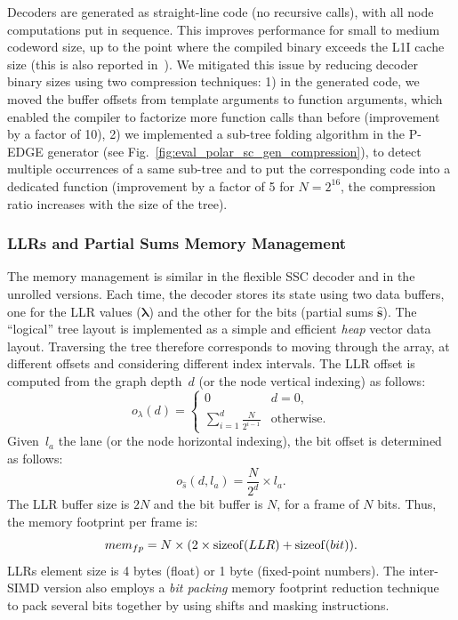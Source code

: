 Decoders are generated as straight-line code (no recursive calls), with all node
computations put in sequence. This improves performance for small to medium
codeword size, up to the point where the compiled binary exceeds the L1I cache
size (this is also reported in~\cite{Giard2016b}). We mitigated this issue by
reducing decoder binary sizes using two compression techniques: 1) in the
generated code, we moved the buffer offsets from template arguments to function
arguments, which enabled the compiler to factorize more function calls than
before (improvement by a factor of 10), 2) we implemented a sub-tree folding
algorithm in the P-EDGE generator (see
Fig.~\ref{fig:eval_polar_sc_gen_compression}), to detect multiple occurrences of
a same sub-tree and to put the corresponding code into a dedicated function
(improvement by a factor of 5 for $N=2^{16}$, the compression ratio increases
with the size of the tree).

\subsubsection{LLRs and Partial Sums Memory Management}

The memory management is similar in the flexible SSC decoder and in the unrolled
versions. Each time, the decoder stores its state using two data buffers, one
for the LLR values ($\bm{\lambda}$) and the other for the bits (partial sums
$\bm{\hat{s}}$). The ``logical'' tree layout is implemented as a simple and
efficient \emph{heap} vector data layout. Traversing the tree therefore
corresponds to moving through the array, at different offsets and considering
different index intervals. The LLR offset is computed from the graph depth~$d$
(or the node vertical indexing) as follows:
\begin{equation}
 o_{\lambda}(d) = \begin{cases}
   0                                         &\text{$d = 0$},\\
   \sum\limits_{i = 1}^{d} \frac{N}{2^{i-1}} &\text{otherwise.}
\end{cases}
\end{equation}
Given~$l_a$ the lane (or the node horizontal indexing), the bit offset is
determined as follows:
\begin{equation}
  o_{\hat{s}}(d,l_a) = \frac{N}{2^d} \times l_a.
\end{equation}
The LLR buffer size is $2N$ and the bit buffer is $N$, for a frame of $N$ bits.
Thus, the memory footprint per frame is:
\begin{equation}
  mem_{fp} = N \times (2 \times \operatorname*{sizeof}(LLR) + \operatorname*{sizeof}(bit)).
\end{equation}
LLRs element size is 4 bytes (float) or 1 byte (fixed-point numbers). The
inter-SIMD version also employs a \emph{bit packing} memory footprint reduction
technique~\cite{LeGal2015a} to pack several bits together by using shifts and
masking instructions.

